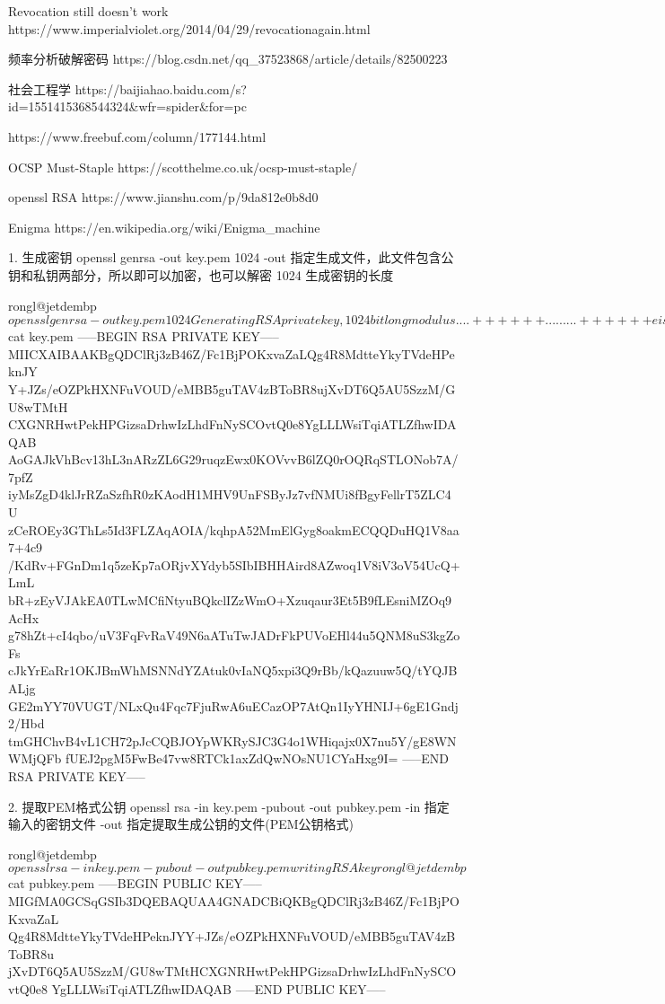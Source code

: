 
Revocation still doesn't work
https://www.imperialviolet.org/2014/04/29/revocationagain.html

频率分析破解密码
https://blog.csdn.net/qq_37523868/article/details/82500223

社会工程学
https://baijiahao.baidu.com/s?id=1551415368544324&wfr=spider&for=pc


https://www.freebuf.com/column/177144.html


OCSP Must-Staple
https://scotthelme.co.uk/ocsp-must-staple/


openssl RSA
https://www.jianshu.com/p/9da812e0b8d0

Enigma
https://en.wikipedia.org/wiki/Enigma_machine





1. 生成密钥
openssl genrsa -out key.pem 1024
    -out 指定生成文件，此文件包含公钥和私钥两部分，所以即可以加密，也可以解密
    1024 生成密钥的长度

    rongl@jetdembp ~ $ openssl genrsa -out key.pem 1024
    Generating RSA private key, 1024 bit long modulus
    ....++++++
    .........++++++
    e is 65537 (0x10001)
    rongl@jetdembp ~ $ cat key.pem
    -----BEGIN RSA PRIVATE KEY-----
    MIICXAIBAAKBgQDClRj3zB46Z/Fc1BjPOKxvaZaLQg4R8MdtteYkyTVdeHPeknJY
    Y+JZs/eOZPkHXNFuVOUD/eMBB5guTAV4zBToBR8ujXvDT6Q5AU5SzzM/GU8wTMtH
    CXGNRHwtPekHPGizsaDrhwIzLhdFnNySCOvtQ0e8YgLLLWsiTqiATLZfhwIDAQAB
    AoGAJkVhBcv13hL3nARzZL6G29ruqzEwx0KOVvvB6lZQ0rOQRqSTLONob7A/7pfZ
    iyMsZgD4klJrRZaSzfhR0zKAodH1MHV9UnFSByJz7vfNMUi8fBgyFellrT5ZLC4U
    zCeROEy3GThLs5Id3FLZAqAOIA/kqhpA52MmElGyg8oakmECQQDuHQ1V8aa7+4c9
    /KdRv+FGnDm1q5zeKp7aORjvXYdyb5SIbIBHHAird8AZwoq1V8iV3oV54UcQ+LmL
    bR+zEyVJAkEA0TLwMCfiNtyuBQkclIZzWmO+Xzuqaur3Et5B9fLEsniMZOq9AcHx
    g78hZt+cI4qbo/uV3FqFvRaV49N6aATuTwJADrFkPUVoEHl44u5QNM8uS3kgZoFs
    cJkYrEaRr1OKJBmWhMSNNdYZAtuk0vIaNQ5xpi3Q9rBb/kQazuuw5Q/tYQJBALjg
    GE2mYY70VUGT/NLxQu4Fqc7FjuRwA6uECazOP7AtQn1IyYHNIJ+6gE1Gndj2/Hbd
    tmGHChvB4vL1CH72pJcCQBJOYpWKRySJC3G4o1WHiqajx0X7nu5Y/gE8WNWMjQFb
    fUEJ2pgM5FwBe47vw8RTCk1axZdQwNOsNU1CYaHxg9I=
    -----END RSA PRIVATE KEY-----


2. 提取PEM格式公钥
openssl rsa -in key.pem -pubout -out pubkey.pem
    -in 指定输入的密钥文件
    -out 指定提取生成公钥的文件(PEM公钥格式)

    rongl@jetdembp ~ $ openssl rsa -in key.pem -pubout -out pubkey.pem
    writing RSA key
    rongl@jetdembp ~ $ cat pubkey.pem
    -----BEGIN PUBLIC KEY-----
    MIGfMA0GCSqGSIb3DQEBAQUAA4GNADCBiQKBgQDClRj3zB46Z/Fc1BjPOKxvaZaL
    Qg4R8MdtteYkyTVdeHPeknJYY+JZs/eOZPkHXNFuVOUD/eMBB5guTAV4zBToBR8u
    jXvDT6Q5AU5SzzM/GU8wTMtHCXGNRHwtPekHPGizsaDrhwIzLhdFnNySCOvtQ0e8
    YgLLLWsiTqiATLZfhwIDAQAB
    -----END PUBLIC KEY-----


